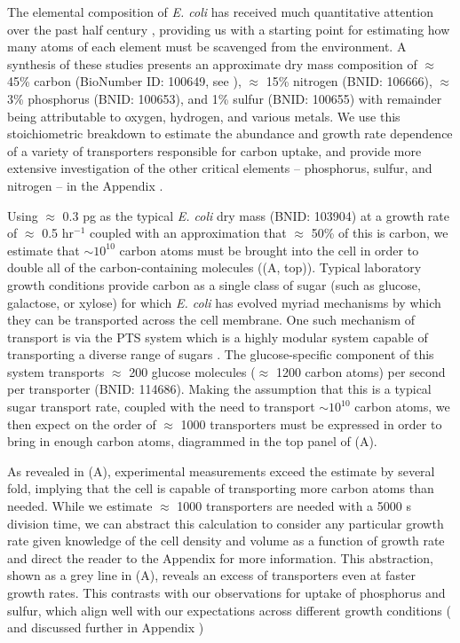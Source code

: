 The elemental composition of \textit{E. coli} has received much quantitative
attention over the past half century \citep{neidhardt1991,
taymaz-nikerel2010, heldal1985, bauer1976}, providing us with a starting
point for estimating how many atoms of each element must be scavenged from
the environment. A synthesis of these studies presents an approximate dry mass
composition of $\approx$ 45\% carbon (BioNumber ID:
100649, see ), $\approx$ 15\% nitrogen (BNID: 106666),
$\approx$ 3\% phosphorus (BNID: 100653), and 1\% sulfur (BNID: 100655) with
remainder being attributable to oxygen, hydrogen, and various metals.
We use this stoichiometric breakdown to estimate the abundance and growth
rate dependence of a variety of transporters responsible for carbon uptake,
and provide more extensive investigation of the other critical elements --
phosphorus, sulfur, and nitrogen -- in the Appendix .

Using $\approx$ 0.3 pg as the typical \textit{E. coli} dry mass (BNID: 103904)
at a growth rate of $\approx$ 0.5 hr$^{-1}$ coupled with an approximation that
$\approx$ 50\% of this is carbon, we estimate that $\sim 10^{10}$ carbon atoms must be
brought into the cell in order to double all of the carbon-containing molecules
((A, top)). Typical laboratory growth conditions provide
carbon as a single class of sugar (such as glucose, galactose, or xylose) for
which \textit{E. coli} has evolved myriad mechanisms by which they can be
transported across the cell membrane. One such mechanism of transport is via
the PTS system which is a highly modular system capable of transporting a
diverse range of sugars \citep{escalante2012}. The glucose-specific component of
this system transports $\approx$ 200 glucose molecules ($\approx$ 1200 carbon
atoms) per second per transporter (BNID: 114686). Making the assumption that this is a typical sugar
transport rate, coupled with the need to transport $\sim 10^{10}$ carbon atoms,
we then expect on the order of $\approx$ 1000 transporters must be expressed in order to
bring in enough carbon atoms, diagrammed in the top panel of
(A).

As revealed in (A), experimental measurements exceed the
estimate by several fold, implying that the cell is capable of transporting
more carbon atoms than needed. While we estimate $\approx$ 1000 transporters
are needed with a 5000 s division time, we can abstract this calculation to
consider any particular growth rate given knowledge of the cell density and
volume as a function of growth rate and direct the reader to the Appendix
 for more information. This abstraction, shown as
a grey line in (A), reveals an excess of transporters even at
faster growth rates. This contrasts with our observations for uptake of
phosphorus and sulfur, which align well with our expectations across different
growth conditions ( and discussed further
in Appendix )

